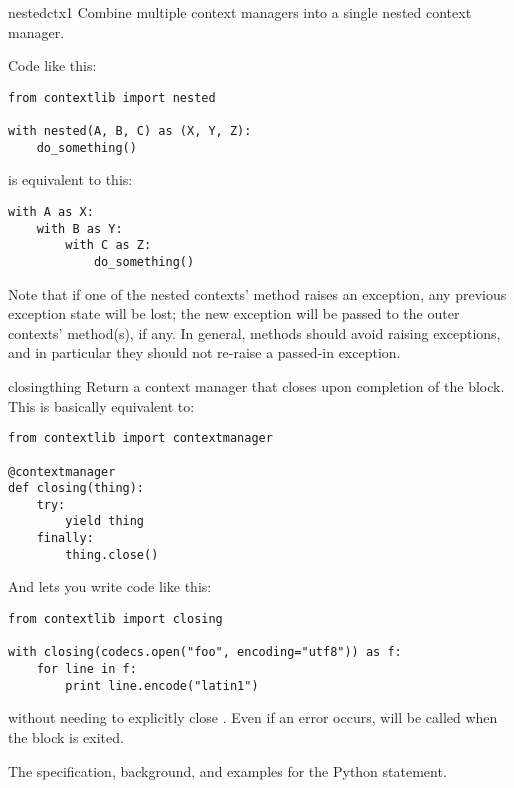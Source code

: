 \begin{funcdesc}{nested}{ctx1}
Combine multiple context managers into a single nested context manager.

Code like this:

\begin{verbatim}
from contextlib import nested

with nested(A, B, C) as (X, Y, Z):
    do_something()
\end{verbatim}

is equivalent to this:

\begin{verbatim}
with A as X:
    with B as Y:
        with C as Z:
            do_something()
\end{verbatim}

Note that if one of the nested contexts'  method
raises an exception, any previous exception state will be lost; the new
exception will be passed to the outer contexts' 
method(s), if any.  In general,  methods should avoid
raising exceptions, and in particular they should not re-raise a
passed-in exception.
\end{funcdesc}

\label{context-closing}
\begin{funcdesc}{closing}{thing}
Return a context manager that closes  upon completion of the
block.  This is basically equivalent to:

\begin{verbatim}
from contextlib import contextmanager

@contextmanager
def closing(thing):
    try:
        yield thing
    finally:
        thing.close()
\end{verbatim}

And lets you write code like this:
\begin{verbatim}
from contextlib import closing

with closing(codecs.open("foo", encoding="utf8")) as f:
    for line in f:
        print line.encode("latin1")
\end{verbatim}

without needing to explicitly close .  Even if an error occurs,
 will be called when the  block is exited.

\end{funcdesc}

\begin{seealso}
         {The specification, background, and examples for the
          Python  statement.}
\end{seealso}
